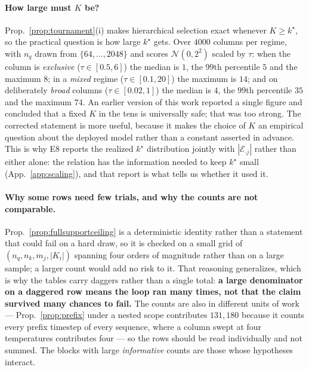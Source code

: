 \documentclass{article}
\begin{document}
\paragraph{How large must $K$ be?} Prop.~\ref{prop:tournament}(i) makes hierarchical selection
exact whenever $K\ge k^\star$, so the practical question is how large $k^\star$ gets. Over $4000$
columns per regime, with $n_q$ drawn from $\{64,\dots,2048\}$ and scores $\mathcal{N}(0,2^2)$
scaled by $\tau$: when the column is \emph{exclusive} ($\tau\in[0.5,6]$) the median is $1$, the
$99$th percentile $5$ and the maximum $8$; in a \emph{mixed} regime ($\tau\in[0.1,20]$) the
maximum is $14$; and on deliberately \emph{broad} columns ($\tau\in[0.02,1]$) the median is $4$,
the $99$th percentile $35$ and the maximum $74$. An earlier version of this work reported a single
figure and concluded that a fixed $K$ in the tens is universally safe; that was too strong. The
corrected statement is more useful, because it makes the choice of $K$ an empirical question
about the deployed model rather than a constant asserted in advance. This is why E8 reports the
realized $k^\star$ distribution jointly with $|\mathcal{E}_{\cdot j}|$ rather than either alone: the
relation has the information needed to keep $k^\star$ small (App.~\ref{app:scaling}), and that
report is what tells us whether it used it.

\paragraph{Why some rows need few trials, and why the counts are not comparable.}
Prop.~\ref{prop:fullsupportceiling} is a deterministic identity rather than a statement that
could fail on a hard draw, so it is checked on a small grid of $(n_q,n_k,m_j,|K_i|)$ spanning
four orders of magnitude rather than on a large sample; a larger count would add no risk to it.
That reasoning generalizes, which is why the tables carry daggers rather than a single total:
\textbf{a large denominator on a daggered row means the loop ran many times, not that the claim
survived many chances to fail.} The counts are also in different units of work ---
Prop.~\ref{prop:prefix} under a nested scope contributes $131{,}180$ because it counts every
prefix timestep of every sequence, where a column swept at four temperatures contributes four ---
so the rows should be read individually and not summed. The blocks with large \emph{informative}
counts are those whose hypotheses interact.
\end{document}
